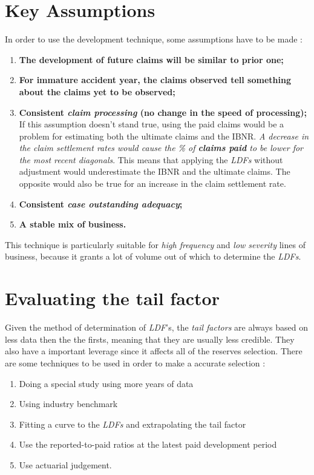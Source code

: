 \documentclass[11pt, english]{memoir}
\numberwithin{definition}{section}
\begin{document}
\section{Key Assumptions}
In order to use the development technique, some assumptions have to be made :
\begin{enumerate}
	\item \textbf{The development of future claims will be similar to prior one;}
	\item \textbf{For immature accident year, the claims observed tell something about the claims yet to be observed;}
	\item \textbf{Consistent \emph{claim processing} (no change in the speed of processing);}\\
	If this assumption doesn't stand true, using the paid claims would be a problem for estimating both the ultimate claims and the IBNR.\emph{ A decrease in the claim settlement rates would cause the \% of \textbf{claims paid} to be lower for the most recent diagonals}. This means that applying the \emph{LDFs} without adjustment would underestimate the IBNR and the ultimate claims. The opposite would also be true for an increase in the claim settlement rate. \\
	\item \textbf{Consistent \emph{case outstanding adequacy};}\\
	
	
	\item \textbf{A stable mix of business.}
\end{enumerate}

This technique is particularly suitable for \emph{high frequency} and \emph{low severity} lines of business, because it grants a lot of volume out of which to determine the \emph{LDFs}. 

\section{Evaluating the tail factor}
Given the method of determination of \emph{LDF}'s, the \emph{tail factors} are always based on less data then the the firsts, meaning that they are usually less credible. They also have a important leverage since it affects all of the reserves selection. There are some techniques to be used in order to make a accurate selection : 
\begin{enumerate}
	\item Doing a special study using more years of data
	\item Using industry benchmark
	\item  Fitting a curve to the \emph{LDFs} and extrapolating the tail factor
	\item Use the reported-to-paid ratios at the latest paid development period
	\item Use actuarial judgement. 
\end{enumerate}
\end{document}
